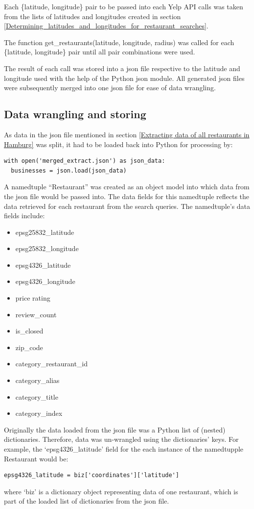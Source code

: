 \documentclass[a4paper, 11pt, oneside]{Thesis}  %
\begin{document}
Each \{latitude, longitude\} pair to be passed into each Yelp API calls was taken from the lists of latitudes and longitudes created in section \ref{Determining_latitudes_and_longitudes_for_restaurant_searches}.

The function get\_restaurants(latitude, longitude, radius) was called for each \{latitude, longitude\} pair until all pair combinations were used.

The result of each call was stored into a \ac{json} file respective to the latitude and longitude used with the help of the Python \ac{json} \cite{json.encoder} module. All generated \ac{json} files were subsequently merged into one \ac{json} file for ease of data wrangling.

\subsection{Data wrangling and storing}

As data in the \ac{json} file mentioned in section \ref{Extracting data of all restaurants in Hamburg} was split, it had to be loaded back into Python for processing by:
\begin{verbatim}
with open('merged_extract.json') as json_data:
  businesses = json.load(json_data)
\end{verbatim}

A namedtuple ``Restaurant'' was created as an object model into which data from the \ac{json} file would be passed into. The data fields for this namedtuple reflects the data retrieved for each restaurant from the search queries. The namedtuple’s data fields include:
\begin{itemize}
\item epsg25832\_latitude
\item epsg25832\_longitude
\item epsg4326\_latitude
\item epsg4326\_longitude
\item price rating
\item review\_count
\item is\_closed
\item zip\_code
\item category\_restaurant\_id 
\item category\_alias
\item category\_title
\item category\_index
\end{itemize}

Originally the data loaded from the \ac{json} file was a Python list of (nested) dictionaries. Therefore, data was un-wrangled using the dictionaries’ keys. For example, the `epsg4326\_latitude’ field for the each instance of the namedtupple Restaurant would be:
\begin{verbatim}
epsg4326_latitude = biz['coordinates']['latitude'] 
\end{verbatim}
where ‘biz’ is a dictionary object representing data of one restaurant, which is part of the loaded list of dictionaries from the \ac{json} file.
\end{document}
